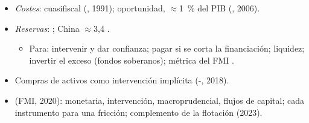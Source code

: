 \documentclass{article}
\begin{document}
\begin{columnas}
\begin{itemize}
\end{itemize}
\begin{itemize}
\item \emph{Costes}: cuasifiscal (, 1991); oportunidad, $\approx$1~\% del PIB (, 2006).
\item \emph{Reservas}: ; China $\approx$3,4 .
  \begin{itemize}
  \item Para: intervenir y dar confianza; pagar si se corta la financiación; liquidez; invertir el exceso (fondos soberanos); métrica del FMI .
  \end{itemize}
\item Compras de activos como intervención implícita (-, 2018).
\item {} (FMI, 2020): monetaria, intervención, macroprudencial, flujos de capital; cada instrumento para una fricción; complemento de la flotación (2023).
\end{itemize}


\end{columnas}
\end{document}
